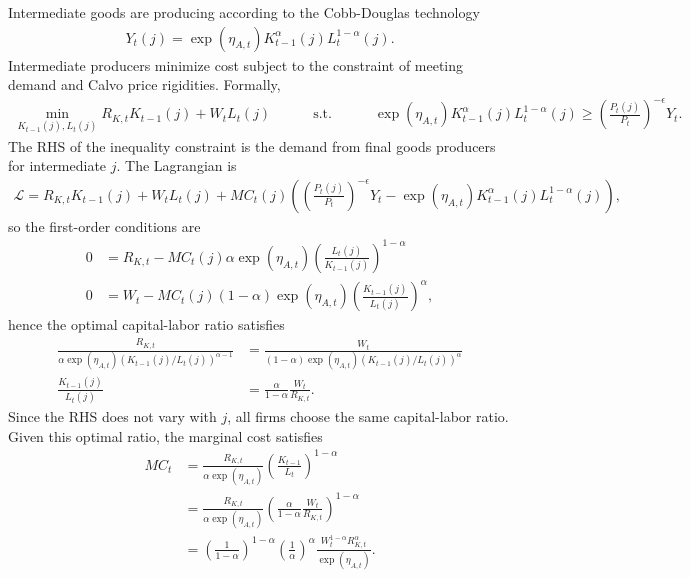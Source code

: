 \documentclass[12 pt, oneside]{article}
\theoremstyle{definition}
\theoremstyle{definition}
\theoremstyle{definition}
\newcommand{\calL}{\mathcal{L}}
\begin{document}
Intermediate goods are producing according to the Cobb-Douglas technology
\begin{align*}
  Y_t(j) = \exp(\eta_{A, t}) K_{t - 1}^\alpha(j)L_t^{1 - \alpha}(j).
\end{align*}
Intermediate producers minimize cost subject to the constraint of meeting demand and Calvo price rigidities. Formally,
\begin{align*}
  \min_{K_{t - 1}(j), L_t(j)} R_{K, t} K_{t - 1}(j) + W_t L_t(j)\quad\quad\quad\text{s.t.}\quad\quad\quad \exp(\eta_{A, t}) K_{t - 1}^\alpha(j) L_t^{1 - \alpha}(j) \geq \left(\frac{P_t(j)}{P_t}\right)^{-\epsilon}Y_t.
\end{align*}
The RHS of the inequality constraint is the demand from final goods producers for intermediate $j$. The Lagrangian is
\begin{align*}
  \calL = R_{K, t} K_{t - 1}(j) + W_t L_t(j) + MC_t(j)\left(\left(\frac{P_t(j)}{P_t}\right)^{-\epsilon}Y_t - \exp(\eta_{A, t}) K_{t - 1}^\alpha(j) L_t^{1 - \alpha}(j)\right),
\end{align*}
so the first-order conditions are
\begin{align*}
  0 & = R_{K, t} - MC_t(j) \alpha \exp(\eta_{A, t}) \left(\frac{L_t(j)}{K_{t - 1}(j)}\right)^{1 - \alpha}\\
  0 & = W_t - MC_t(j) (1-\alpha) \exp(\eta_{A, t}) \left(\frac{K_{t - 1}(j)}{L_t(j)}\right)^{\alpha},
\end{align*}
hence the optimal capital-labor ratio satisfies
\begin{align*}
  \frac{R_{K, t}}{\alpha \exp(\eta_{A, t})(K_{t - 1}(j)/L_t(j))^{\alpha - 1}} & = \frac{W_t}{(1-\alpha) \exp(\eta_{A, t})(K_{t - 1}(j)/L_t(j))^{ \alpha}}\\
  \frac{K_{t - 1}(j)}{L_t(j)} & =\frac{\alpha}{1 - \alpha} \frac{W_t}{R_{K, t}}.
\end{align*}
Since the RHS does not vary with $j$, all firms choose the same capital-labor ratio. Given this optimal ratio, the marginal cost satisfies
\begin{align*}
  MC_t & = \frac{R_{K, t}}{\alpha \exp(\eta_{A, t})}\left(\frac{K_{t - 1}}{L_t}\right)^{1 - \alpha}\\
       & =  \frac{R_{K, t}}{\alpha \exp(\eta_{A, t})}\left(\frac{\alpha}{1 - \alpha} \frac{W_t}{R_{K, t}}\right)^{1 - \alpha}\\
       & =  \left(\frac{1}{1 - \alpha}\right)^{1 - \alpha}\left(\frac{1}{\alpha}\right)^{\alpha}\frac{W_t^{1 - \alpha}R_{K, t}^{\alpha}}{ \exp(\eta_{A, t})}.
\end{align*}
\end{document}
